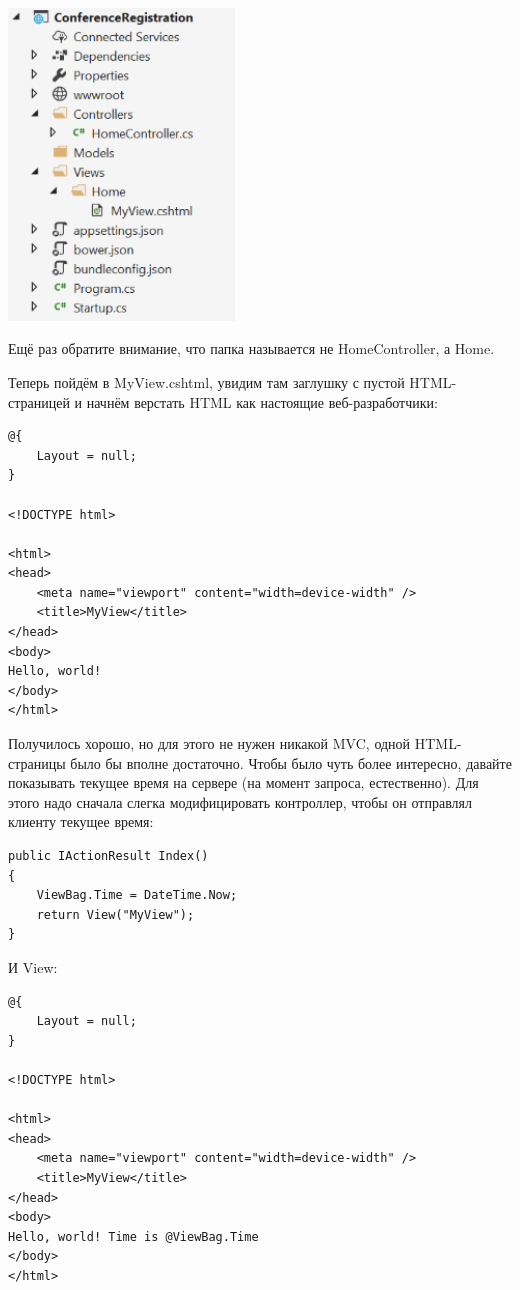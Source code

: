 \documentclass[a5paper]{article}
\begin{document}
\begin{center}
	\includegraphics[width=0.45\textwidth]{projectStructure.png}
\end{center}

Ещё раз обратите внимание, что папка называется не HomeController, а Home.

Теперь пойдём в MyView.cshtml, увидим там заглушку с пустой HTML-страницей и начнём верстать HTML как настоящие веб-разработчики:

\begin{verbatim}
@{
    Layout = null;
}

<!DOCTYPE html>

<html>
<head>
    <meta name="viewport" content="width=device-width" />
    <title>MyView</title>
</head>
<body>
Hello, world!
</body>
</html>
\end{verbatim}

Получилось хорошо, но для этого не нужен никакой MVC, одной HTML-страницы было бы вполне достаточно. Чтобы было чуть более интересно, давайте показывать текущее время на сервере (на момент запроса, естественно). Для этого надо сначала слегка модифицировать контроллер, чтобы он отправлял
клиенту текущее время:

\begin{verbatim}
public IActionResult Index()
{
    ViewBag.Time = DateTime.Now;
    return View("MyView");
}
\end{verbatim}

И View:

\begin{verbatim}
@{
    Layout = null;
}

<!DOCTYPE html>

<html>
<head>
    <meta name="viewport" content="width=device-width" />
    <title>MyView</title>
</head>
<body>
Hello, world! Time is @ViewBag.Time
</body>
</html>
\end{verbatim}
\end{document}
